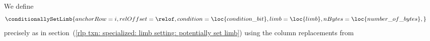 We define
\[
	\conditionallySetLimb {
		anchorRow  = i                       ,
		relOffset  = \relof                  ,
		condition  = \loc{condition\_bit}    ,
		limb       = \loc{limb}              ,
		nBytes     = \loc{number\_of\_bytes} ,
	}
\]
precisely as in
section~(\ref{rlp txn: specialized: limb setting: potentially set limb})
using the column replacements from
